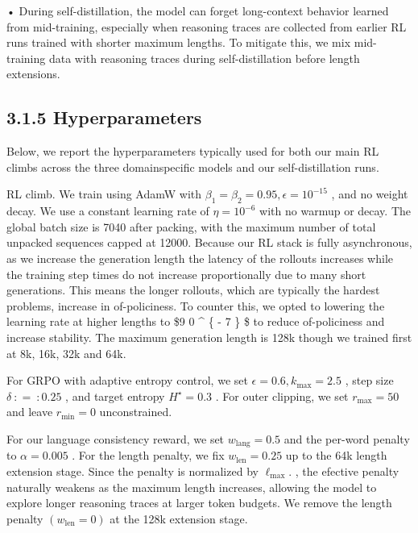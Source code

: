 \documentclass[
  10
]{article}
\begin{document}
• During self-distillation, the model can forget long-context behavior
learned from mid-training, especially when reasoning traces are
collected from earlier RL runs trained with shorter maximum lengths. To
mitigate this, we mix mid-training data with reasoning traces during
self-distillation before length extensions.

\subsection{3.1.5 Hyperparameters}\label{hyperparameters-1}

Below, we report the hyperparameters typically used for both our main RL
climbs across the three domainspecific models and our self-distillation
runs.

RL climb. We train using AdamW with
\(\beta _ { 1 } = \beta _ { 2 } = 0 . 9 5 , \epsilon = 1 0 ^ { - 1 5 }\)
, and no weight decay. We use a constant learning rate of
\(\eta = 1 0 ^ { - 6 }\) with no warmup or decay. The global batch size
is 7040 after packing, with the maximum number of total unpacked
sequences capped at 12000. Because our RL stack is fully asynchronous,
as we increase the generation length the latency of the rollouts
increases while the training step times do not increase proportionally
due to many short generations. This means the longer rollouts, which are
typically the hardest problems, increase in of-policiness. To counter
this, we opted to lowering the learning rate at higher lengths to \$9
 0 \^{} \{ - 7 \} \$ to reduce of-policiness and increase
stability. The maximum generation length is 128k though we trained first
at 8k, 16k, 32k and 64k.

For GRPO with adaptive entropy control, we set
\(\epsilon = 0 . 6 , k _ { \mathrm { m a x } } = 2 . 5\) , step size
\(\delta \ : = \ : 0 . 2 5\) , and target entropy
\(H ^ { \star } = 0 . 3\) . For outer clipping, we set
\(r _ { \operatorname* { m a x } } = 5 0\) and leave
\(r _ { \operatorname* { m i n } } = 0\) unconstrained.

For our language consistency reward, we set
\(w _ { \mathrm { l a n g } } = 0 . 5\) and the per-word penalty to
\(\alpha = 0 . 0 0 5\) . For the length penalty, we fix
\(w _ { \mathrm { l e n } } = 0 . 2 5\) up to the 64k length extension
stage. Since the penalty is normalized by
\(\ell _ { \mathrm { m a x } } .\) , the efective penalty naturally
weakens as the maximum length increases, allowing the model to explore
longer reasoning traces at larger token budgets. We remove the length
penalty \(( w _ { \mathrm { l e n } } = 0 )\) at the 128k extension
stage.
\end{document}
